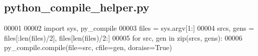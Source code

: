 \subsection{python\+\_\+compile\+\_\+helper.\+py}
\label{python__compile__helper_8py_source}

\begin{DoxyCode}
00001 
00002 \textcolor{keyword}{import} sys, py\_compile
00003 files = sys.argv[1:]
00004 srcs, gens = files[:len(files)/2], files[len(files)/2:]
00005 \textcolor{keywordflow}{for} src, gen \textcolor{keywordflow}{in} zip(srcs, gens):
00006     py\_compile.compile(file=src, cfile=gen, doraise=\textcolor{keyword}{True})
\end{DoxyCode}
